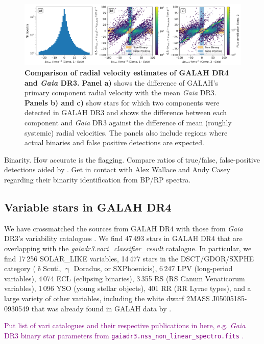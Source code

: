 \documentclass[
  journal=pasa,
  manuscript=research-paper, %
  year=2024,
  volume=37
]{cup-journal}
\newcommand{\SB}[1]{{\textcolor{purple}{#1}}}
\newcommand{\Gaia}{\textit{Gaia}\xspace}
\begin{document}
\begin{figure}[hbt]
 \centering
 \includegraphics[width=\textwidth]{figures/vrad_comparison_comp1_comp2_gaiadr3.png}
 \caption{\textbf{Comparison of radial velocity estimates of GALAH DR4 and \textit{Gaia} DR3.} \textbf{Panel a)} shows the difference of GALAH's primary component radial velocity with the mean \textit{Gaia} DR3. \textbf{Panels b) and c)} show stars for which two components were detected in GALAH DR3 and shows the difference between each component and \textit{Gaia} DR3 against the difference of mean (roughly systemic) radial velocities. The panels also include regions where actual binaries and false positive detections are expected.}
 \label{fig:vrad_comparison_comp1_comp2_gaiadr3}
\end{figure}

Binarity. How accurate is the flagging. Compare ratios of true/false, false-positive detections aided by \citet{Traven2020}. Get in contact with Alex Wallace and Andy Casey regarding their binarity identification from BP/RP spectra.

\subsection{Variable stars in GALAH DR4}

We have crossmatched the sources from GALAH DR4 with those from \Gaia DR3's variability catalogues \citep{Rimoldini2023}. We find 47\,493 stars in GALAH DR4 that are overlapping with the \textit{gaiadr3.vari\_classifier\_result} catalogue. In particular, we find 17\,256 SOLAR\_LIKE variables, 14\,477 stars in the DSCT/GDOR/SXPHE category ({$\updelta$}Scuti, {$\upgamma$} Doradus, or SXPhoenicis), 6\,247 LPV (long-period variables), 4\,074 ECL (eclipsing binaries), 3\,355 RS (RS Canum Venaticorum variables), 1\,096 YSO (young stellar objects), 401 RR (RR Lyrae types), and a large variety of other variables, including the white dwarf 2MASS J05005185-0930549 that was already found in GALAH data by \citet{Kawka2020}.

\SB{Put list of vari catalogues and their respective publications in here, e.g. \Gaia DR3 binary star parameters from \texttt{gaiadr3.nss\_non\_linear\_spectro.fits} \citep{Halbwachs2023}.
}
\end{document}
